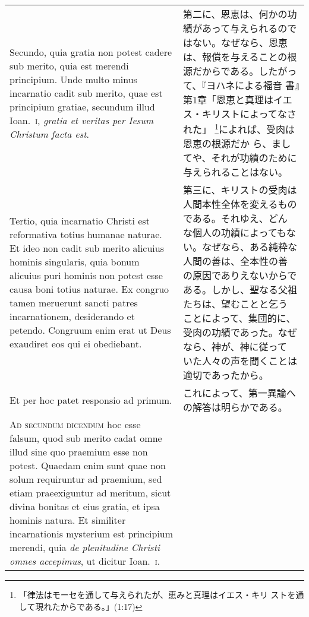 \documentclass[10pt]{jsarticle} %
\begin{document}
\begin{longtable}{p{21em}p{21em}}
\\

Secundo, quia gratia non potest cadere sub merito, quia est merendi
principium. Unde multo minus incarnatio cadit sub merito, quae est
principium gratiae, secundum illud Ioan.~{\scshape i}, {\itshape
gratia et veritas per Iesum Christum facta est}.


&


第二に、恩恵は、何かの功績があって与えられるのではない。なぜなら、恩恵
は、報償を与えることの根源だからである。したがって、『ヨハネによる福音
書』第1章「恩恵と真理はイエス・キリストによってなされた」
\footnote{「律法はモーセを通して与えられたが、恵みと真理はイエス・キリ
ストを通して現れたからである。」(1:17)}によれば、受肉は恩恵の根源だか
ら、ましてや、それが功績のために与えられることはない。

\\



Tertio, quia incarnatio Christi est reformativa totius humanae
naturae. Et ideo non cadit sub merito alicuius hominis singularis,
quia bonum alicuius puri hominis non potest esse causa boni totius
naturae. Ex congruo tamen meruerunt sancti patres incarnationem,
desiderando et petendo. Congruum enim erat ut Deus exaudiret eos qui
ei obediebant.


&


第三に、キリストの受肉は人間本性全体を変えるものである。それゆえ、どん
な個人の功績によってもない。なぜなら、ある純粋な人間の善は、全本性の善
の原因でありえないからである。しかし、聖なる父祖たちは、望むことと乞う
ことによって、集団的に、受肉の功績であった。なぜなら、神が、神に従って
いた人々の声を聞くことは適切であったから。

\\



Et per hoc patet responsio ad primum.

&


これによって、第一異論への解答は明らかである。

\\


{\scshape Ad secundum dicendum} hoc esse falsum, quod sub merito cadat
omne illud sine quo praemium esse non potest. Quaedam enim sunt quae
non solum requiruntur ad praemium, sed etiam praeexiguntur ad meritum,
sicut divina bonitas et eius gratia, et ipsa hominis natura. Et
similiter incarnationis mysterium est principium merendi, quia
{\itshape de plenitudine Christi omnes accepimus}, ut dicitur
Ioan.~{\scshape i}.



\end{longtable}
\end{document}
